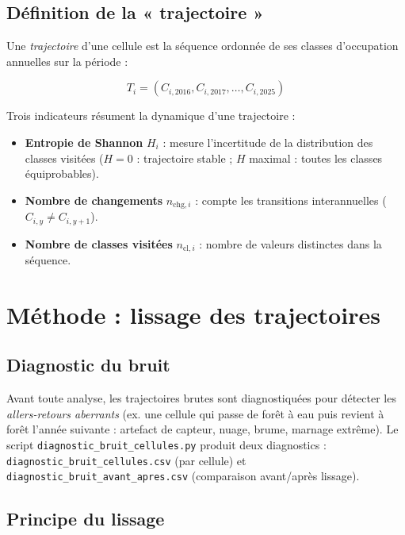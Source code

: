 \subsection{Définition de la « trajectoire »}

Une \emph{trajectoire} d'une cellule est la séquence ordonnée de ses classes
d'occupation annuelles sur la période :

\[
T_i = \left( C_{i,2016}, C_{i,2017}, \dots, C_{i,2025} \right)
\]

Trois indicateurs résument la dynamique d'une trajectoire :

\begin{itemize}
  \item \textbf{Entropie de Shannon} $H_i$ : mesure l'incertitude de la
        distribution des classes visitées ($H=0$ : trajectoire stable ; $H$
        maximal : toutes les classes équiprobables).
  \item \textbf{Nombre de changements} $n_{\text{chg},i}$ : compte les
        transitions interannuelles ($C_{i,y} \neq C_{i,y+1}$).
  \item \textbf{Nombre de classes visitées} $n_{\text{cl},i}$ : nombre de
        valeurs distinctes dans la séquence.
\end{itemize}

\section{Méthode : lissage des trajectoires}

\subsection{Diagnostic du bruit}

Avant toute analyse, les trajectoires brutes sont diagnostiquées pour détecter
les \emph{allers-retours aberrants} (ex. une cellule qui passe de forêt à eau
puis revient à forêt l'année suivante : artefact de capteur, nuage, brume,
marnage extrême). Le script
\texttt{diagnostic_bruit_cellules.py} produit deux
diagnostics : \texttt{diagnostic_bruit_cellules.csv} (par cellule) et
\texttt{diagnostic_bruit_avant_apres.csv} (comparaison avant/après lissage).

\subsection{Principe du lissage}


